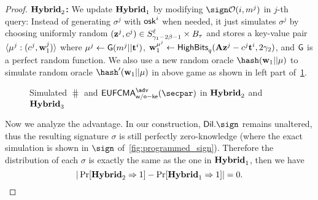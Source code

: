 \begin{proof}
\noindent\textbf{$\mathbf{Hybrid}_2$:} We update $\mathbf{Hybrid}_1$ by modifying $\sign\Oc(i, m^j)$ in $j$-th query: Instead of generating $\sigma^j$ with $\mathsf{osk}^i$ when needed, it just simulates $\sigma^j$  by choosing uniformly random $(\mathbf{z}^j, c^j)\in S^\ell_{\gamma_1-2\beta-1}\times B_\tau$ and stores a key-value pair $\langle\mu^j: (c^j,\mathbf{w}_1^j)\rangle$ where $\mu^j\gets\mathsf{G}(m^j||\mathbf{t}^i)$, $\mathbf{w}_1^{\mu^j} \gets \mathsf{HighBits}_q(\mathbf{A}\mathbf{z}^j-c^j\mathbf{t}^i, 2\gamma_2)$, and $\mathsf{G}$ is a perfect random function. We also use a new random oracle $\hash(\wn_1 || \mu)$ to simulate random oracle $\hash'(\wn_1 || \mu)$ in above game as shown in left part of~\cref{fig:programmed-random-oracle}.
\begin{figure}[!t]
    \centering
    \begin{pchstack}[boxed]
    \pchspace
    \end{pchstack}
\caption{Simulated $\hash$ and $\eufcmawoke^\adv(\secpar)$ in $\mathbf{Hybrid}_2$ and $\mathbf{Hybrid}_3$}
\label{fig:programmed-random-oracle}
\end{figure}
Now we analyze the advantage. In our construction, $\Dil.\sign$ remains unaltered, thus the resulting signature $\sigma$ is still perfectly zero-knowledge (where the exact simulation is shown in $\sign$ of~\cref{fig:programmed_sign}).
Therefore the distribution of each $\sigma$ is exactly the same as the one in $\mathbf{Hybrid}_1$, then we have
$$|\Pr[\mathbf{Hybrid}_2\Rightarrow 1] - \Pr[\mathbf{Hybrid}_1\Rightarrow 1]| = 0.$$


\end{proof}
